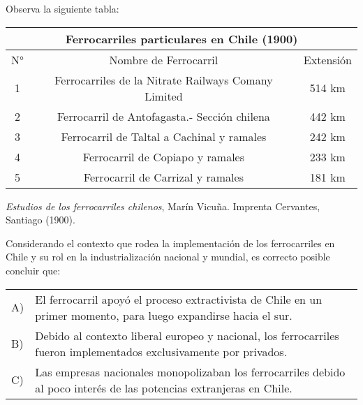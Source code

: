 \documentclass[letterpaper,11pt]{article}
\newcommand{\anchopregunta}{0.9\textwidth}
\begin{document}
\begin{enumerate}
\begin{minipage}{\anchopregunta}
\item Observa la siguiente tabla:
\begin{center}
   \begin{tabular}{|ccc|}
\hline
\multicolumn{3}{|c|}{Ferrocarriles particulares en Chile (1900)}                                                \\ \hline
\multicolumn{1}{|c|}{N°} & \multicolumn{1}{c|}{Nombre de Ferrocarril}                               & Extensión \\ \hline
\multicolumn{1}{|c|}{1}  & \multicolumn{1}{c|}{Ferrocarriles de la Nitrate Railways Comany Limited} & 514 km    \\ \hline
\multicolumn{1}{|c|}{2}  & \multicolumn{1}{c|}{Ferrocarril de Antofagasta.- Sección chilena}        & 442 km    \\ \hline
\multicolumn{1}{|c|}{3}  & \multicolumn{1}{c|}{Ferrocarril de Taltal a Cachinal y ramales}          & 242 km    \\ \hline
\multicolumn{1}{|c|}{4}  & \multicolumn{1}{c|}{Ferrocarril de Copiapo y ramales}                    & 233 km    \\ \hline
\multicolumn{1}{|c|}{5}  & \multicolumn{1}{c|}{Ferrocarril de Carrizal y ramales}                   & 181 km    \\ \hline
\end{tabular}
\end{center}
\begin{flushright}
\textit{Estudios de los ferrocarriles chilenos}, Marín Vicuña. Imprenta Cervantes, Santiago (1900).
\end{flushright}
Considerando el contexto que rodea la implementación de los ferrocarriles en Chile y su rol en la industrialización nacional y mundial, es correcto posible concluir que:
\begin{flushleft}\begin{tabular}{@{\hspace{-.001\textwidth}}l@{\hspace{2pt}}p{}}
A)& El ferrocarril apoyó el proceso extractivista de Chile en un primer momento, para luego expandirse hacia el sur.\\
B)& Debido al contexto liberal europeo y nacional, los ferrocarriles fueron implementados exclusivamente por privados.\\
C)& Las empresas nacionales monopolizaban los ferrocarriles debido al poco interés de las potencias extranjeras en Chile.\\

\end{tabular}
\end{flushleft}
\end{minipage}
\end{enumerate}
\end{document}
